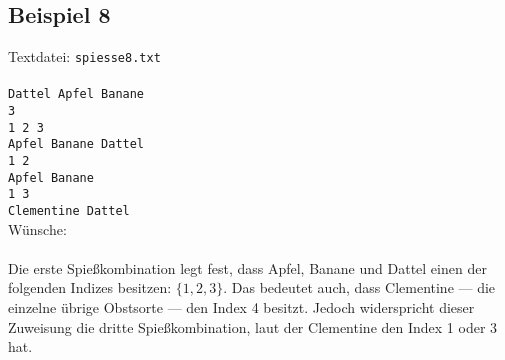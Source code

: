 \subsection{Beispiel 8}\label{example:8}
Textdatei: \texttt{spiesse8.txt}\vspace{10pt}\\
\texttt{
\\
Dattel Apfel Banane\\
3\\
1 2 3\\
Apfel Banane Dattel\\
1 2\\
Apfel Banane\\
1 3\\
Clementine Dattel}\\

\noindent
Wünsche: \\

\noindent
{}\\

Die erste Spießkombination legt fest, dass Apfel, Banane und Dattel einen der folgenden Indizes
besitzen: $\{1, 2, 3\}$.  Das bedeutet auch, dass Clementine --- die einzelne übrige Obstsorte ---
den Index 4 besitzt. Jedoch widerspricht dieser Zuweisung die dritte Spießkombination,
laut der Clementine den Index 1 oder 3 hat. 
